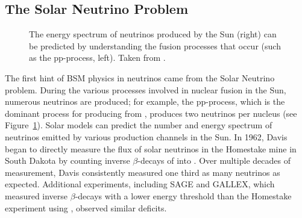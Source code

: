 \documentclass[/main.tex]{subfiles}
\begin{document}
\subsection{The Solar Neutrino Problem}
\begin{figure}[t]
  \centering
  \caption[Neutrinos produced by Solar fusion]{\label{fig:ppproc}
    The energy spectrum of neutrinos produced by the Sun (right) can be predicted by understanding the fusion processes that occur (such as the pp-process, left). Taken from \cite{PDG2018}.
  }
\end{figure}
The first hint of BSM physics in neutrinos came from the Solar Neutrino problem.
During the various processes involved in nuclear fusion in the Sun, numerous neutrinos are produced; for example, the pp-process, which is the dominant process for producing  from , produces two neutrinos per  nucleus (see Figure~\ref{fig:ppproc}).
Solar models can predict the number and energy spectrum of neutrinos emitted by various production channels in the Sun\cite{Bahcall2005}.
In 1962, Davis began to directly measure the flux of solar neutrinos in the Homestake mine in South Dakota by counting inverse $\beta$-decays of  into .
Over multiple decades of measurement, Davis consistently measured one third as many neutrinos as expected\cite{Cleveland1998}.
Additional experiments, including SAGE and GALLEX, which measured inverse $\beta$-decays with a lower energy threshold than the Homestake experiment using , observed similar deficits\cite{SageGallex1999}.
\end{document}

